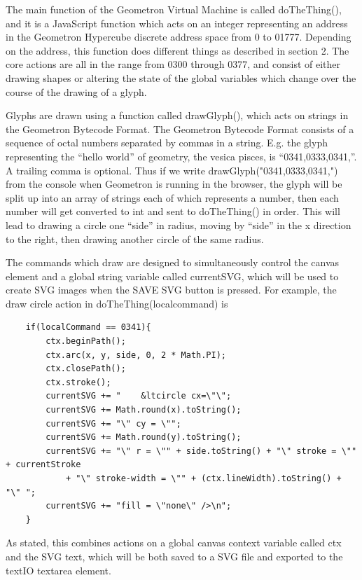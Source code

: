 \documentclass[11pt]{article}
\begin{document}
    The main function of the Geometron Virtual Machine is called doTheThing(), and it is a JavaScript function which acts on an integer representing an address in the Geometron Hypercube discrete address space from 0 to 01777.  Depending on the address, this function does different things as described in section 2.  The core actions are all in the range from 0300 through 0377, and consist of either drawing shapes or altering the state of the global variables which change over the course of the drawing of a glyph.  




    Glyphs are drawn using a function called drawGlyph(), which acts on strings in the Geometron Bytecode Format.  The Geometron Bytecode Format consists of a sequence of octal numbers separated by commas in a string.  E.g. the glyph representing the ``hello world'' of geometry, the vesica pisces, is ``0341,0333,0341,''.  A trailing comma is optional.  Thus if we write drawGlyph("0341,0333,0341,") from the console when Geometron is running in the browser, the glyph will be split up into an array of strings each of which represents a number, then each number will get converted to int and sent to doTheThing() in order.  This will lead to drawing a circle one ``side'' in radius, moving by ``side'' in the x direction to the right, then drawing another circle of the same radius.   




    The commands which draw are designed to simultaneously control the canvas element and a global string variable called currentSVG, which will be used to create SVG images when the SAVE SVG button is pressed.  For example, the draw circle action in doTheThing(localcommand) is 


\begin{verbatim}
    if(localCommand == 0341){
        ctx.beginPath();
        ctx.arc(x, y, side, 0, 2 * Math.PI);
        ctx.closePath();
        ctx.stroke();
        currentSVG += "    &ltcircle cx=\"\";
        currentSVG += Math.round(x).toString();
        currentSVG += "\" cy = \"";
        currentSVG += Math.round(y).toString();
        currentSVG += "\" r = \"" + side.toString() + "\" stroke = \"" + currentStroke 
            + "\" stroke-width = \"" + (ctx.lineWidth).toString() + "\" ";
        currentSVG += "fill = \"none\" />\n";		
    }
\end{verbatim}


    As stated, this combines actions on a global canvas context variable called ctx and the SVG text, which will be both saved to a SVG file and exported to the textIO textarea element.   
\end{document}

